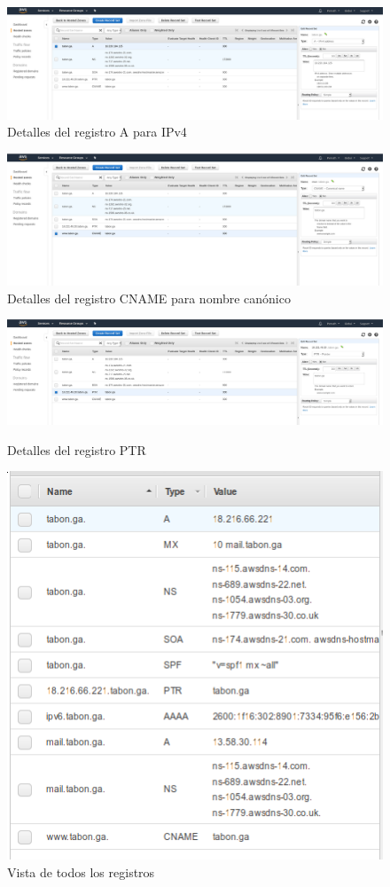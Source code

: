 \documentclass[9pt]{article}
\begin{document}
\begin{figure}[H]
  \centering
  \includegraphics[width=0.8\linewidth]{A}
  \caption{Detalles del registro A para IPv4}
\end{figure}
\begin{figure}[H]
  \centering
  \includegraphics[width=0.8\linewidth]{CNAME}
  \caption{Detalles del registro CNAME para nombre canónico}
\end{figure}
\begin{figure}[H]
  \centering
  \includegraphics[width=0.8\linewidth]{PTR}
  \caption{Detalles del registro PTR}
  \includegraphics[scale=0.5]{record_set}
  \caption{Vista de todos los registros}
\end{figure}
\end{document}
